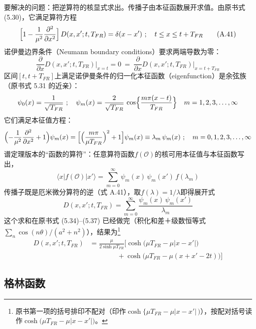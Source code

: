 要解决的问题：把逆算符的核显式求出。传播子由本征函数展开求值。由原书式 (5.30)，它满足算符方程
\begin{equation*}
\Bigl[1-\frac{1}{\mu^{2}}\frac{\partial^{2}}{\partial x^{2}}\Bigr]\,
D(x,x';t,T_{FR})=\delta(x-x')
\ ;\quad t\le x\le t+T_{FR}
\tag{A.41}
\end{equation*}
诺伊曼边界条件（Neumann boundary conditions）要求两端导数为零：
\begin{equation*}
\frac{\partial}{\partial x}D(x,x';t,T_{FR})\Bigr|_{x=t}
=0\ =\
\frac{\partial}{\partial x}D(x,x';t,T_{FR})\Bigr|_{x=t+T_{FR}}
\tag{A.42}
\end{equation*}
区间$[t,t+T_{FR}]$上满足诺伊曼条件的归一化本征函数（eigenfunction）是余弦族（原书式 5.31 的近亲）：
\begin{equation*}
\psi_0(x)=\frac{1}{\sqrt{T_{FR}}}
\ ;\quad
\psi_m(x)=\frac{2}{\sqrt{T_{FR}}}\,
\cos\Bigl\{\frac{m\pi(x-t)}{T_{FR}}\Bigr\}
\quad m=1,2,3,\ldots,\infty
\end{equation*}
它们满足本征值方程：
\begin{equation*}
\Bigl(-\frac{1}{\mu^{2}}\frac{\partial^{2}}{\partial x^{2}}+1\Bigr)\psi_m(x)
=\Bigl[\Bigl(\frac{m\pi}{\mu T_{FR}}\Bigr)^{2}+1\Bigr]\psi_m(x)
\equiv\lambda_m\,\psi_m(x)
\ ;\quad m=0,1,2,3,\ldots,\infty
\end{equation*}
谱定理版本的“函数的算符”：任意算符函数$f(\mathcal{O})$的核可用本征值与本征函数写出，
\begin{equation*}
\langle x|f(\mathcal{O})|x'\rangle
=\sum_{m=0}^{\infty}\psi_m(x)\,\psi_m(x')\,f(\lambda_m)
\end{equation*}
传播子既是厄米微分算符的逆（式 A.41），取$f(\lambda)=1/\lambda$即得展开式
\begin{equation*}
D(x,x';t,T_{FR})
=\sum_{m=0}^{\infty}\frac{\psi_m(x)\,\psi_m(x')}{\lambda_m}
\end{equation*}
这个求和在原书式 (5.34)--(5.37) 已经做完（积化和差＋级数恒等式$\sum_n\cos(n\theta)/(a^2+n^2)$），结果为\footnote{原书第一项的括号排印不配对（印作$\cosh\{\mu T_{FR}-\mu|x-x'|\,)$），按配对括号读作$\cosh\bigl(\mu T_{FR}-\mu|x-x'|\bigr)$。}
\begin{align*}
D(x,x';t,T_{FR})
&=\frac{\mu}{2\sinh\mu T_{FR}}
\bigl[\cosh\bigl(\mu T_{FR}-\mu|x-x'|\bigr)\\
&\qquad\qquad
+\cosh\bigl(\mu T_{FR}-\mu(x+x'-2t)\bigr)\bigr]
\tag{A.43}
\end{align*}

\subsection{格林函数}


